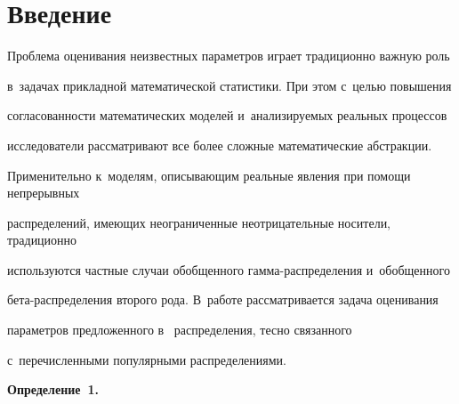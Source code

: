 









 \thispagestyle{headings}


 







\section{Введение}











Проблема оценивания неизвестных параметров играет традиционно важную роль 


в~задачах прикладной математической статистики. При этом с~целью повышения 


согласованности математических моделей и~анализируемых реальных процессов 


исследователи рас\-смат\-ри\-ва\-ют все более сложные математические абстракции. 


Применительно к~моделям, описывающим реальные явления при помощи непрерывных 


распределений, имеющих неограниченные неотрицательные носители, традиционно 


используются частные случаи обобщенного гам\-ма-рас\-пре\-де\-ле\-ния и~обобщенного 


бета-рас\-пре\-де\-ле\-ния второго рода. В~работе рас\-смат\-ри\-ва\-ет\-ся задача оценивания 


параметров предложенного в~\cite{Ku2019_2} распределения, тесно связанного 


с~перечисленными популярными распределениями.





\smallskip





\noindent


\textbf{Определение~1.}\



